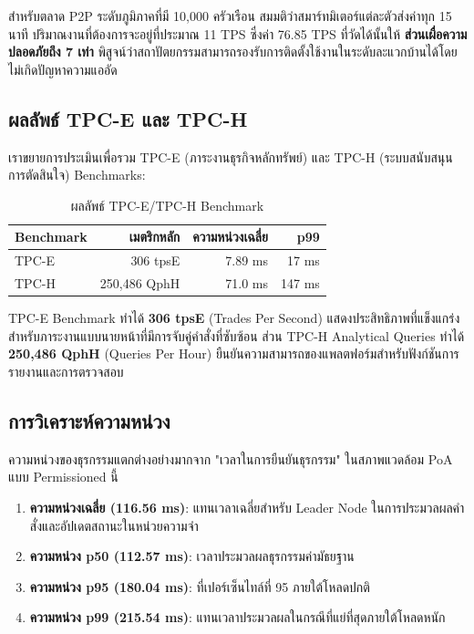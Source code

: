 \documentclass[conference,10pt]{IEEEtran}
\begin{document}
สำหรับตลาด P2P ระดับภูมิภาคที่มี 10,000 ครัวเรือน สมมติว่าสมาร์ทมิเตอร์แต่ละตัวส่งค่าทุก 15 นาที ปริมาณงานที่ต้องการจะอยู่ที่ประมาณ 11 TPS ซึ่งค่า 76.85 TPS ที่วัดได้นั้นให้ \textbf{ส่วนเผื่อความปลอดภัยถึง 7 เท่า} พิสูจน์ว่าสถาปัตยกรรมสามารถรองรับการติดตั้งใช้งานในระดับละแวกบ้านได้โดยไม่เกิดปัญหาความแออัด

\subsection{ผลลัพธ์ TPC-E และ TPC-H}
เราขยายการประเมินเพื่อรวม TPC-E (ภาระงานธุรกิจหลักทรัพย์) และ TPC-H (ระบบสนับสนุนการตัดสินใจ) Benchmarks:

\begin{table}[t!]
\caption{ผลลัพธ์ TPC-E/TPC-H Benchmark}
\begin{center}
\begin{tabular}{|l|r|r|r|}
\hline
\textbf{Benchmark} & \textbf{เมตริกหลัก} & \textbf{ความหน่วงเฉลี่ย} & \textbf{p99} \\
\hline
TPC-E & 306 tpsE & 7.89 ms & 17 ms \\
TPC-H & 250,486 QphH & 71.0 ms & 147 ms \\
\hline
\end{tabular}
\label{tab:tpce-tpch}
\end{center}
\end{table}

TPC-E Benchmark ทำได้ \textbf{306 tpsE} (Trades Per Second) แสดงประสิทธิภาพที่แข็งแกร่งสำหรับภาระงานแบบนายหน้าที่มีการจับคู่คำสั่งที่ซับซ้อน ส่วน TPC-H Analytical Queries ทำได้ \textbf{250,486 QphH} (Queries Per Hour) ยืนยันความสามารถของแพลตฟอร์มสำหรับฟังก์ชันการรายงานและการตรวจสอบ

\subsection{การวิเคราะห์ความหน่วง}
ความหน่วงของธุรกรรมแตกต่างอย่างมากจาก "เวลาในการยืนยันธุรกรรม" ในสภาพแวดล้อม PoA แบบ Permissioned นี้
\begin{enumerate}
    \item \textbf{ความหน่วงเฉลี่ย (116.56 ms)}: แทนเวลาเฉลี่ยสำหรับ Leader Node ในการประมวลผลคำสั่งและอัปเดตสถานะในหน่วยความจำ
    \item \textbf{ความหน่วง p50 (112.57 ms)}: เวลาประมวลผลธุรกรรมค่ามัธยฐาน
    \item \textbf{ความหน่วง p95 (180.04 ms)}: ที่เปอร์เซ็นไทล์ที่ 95 ภายใต้โหลดปกติ
    \item \textbf{ความหน่วง p99 (215.54 ms)}: แทนเวลาประมวลผลในกรณีที่แย่ที่สุดภายใต้โหลดหนัก
\end{enumerate}
\end{document}
